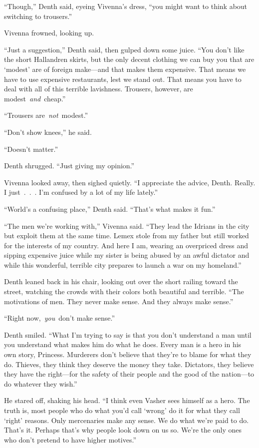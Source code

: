 “Though,” Denth said, eyeing Vivenna’s dress, “you might want to think about switching to trousers.”

Vivenna frowned, looking up.

“Just a suggestion,” Denth said, then gulped down some juice. “You don’t like the short Hallandren skirts, but the only decent clothing we can buy you that are ‘modest’ are of foreign make—and that makes them expensive. That means we have to use expensive restaurants, lest we stand out. That means you have to deal with all of this terrible lavishness. Trousers, however, are modest~\textit{and}~cheap.”

“Trousers are~\textit{not}~modest.”

“Don’t show knees,” he said.

“Doesn’t matter.”

Denth shrugged. “Just giving my opinion.”

Vivenna looked away, then sighed quietly. “I appreciate the advice, Denth. Really. I just~.~.~. I’m confused by a lot of my life lately.”

“World’s a confusing place,” Denth said. “That’s what makes it fun.”

“The men we’re working with,” Vivenna said. “They lead the Idrians in the city but exploit them at the same time. Lemex stole from my father but still worked for the interests of my country. And here I am, wearing an overpriced dress and sipping expensive juice while my sister is being abused by an awful dictator and while this wonderful, terrible city prepares to launch a war on my homeland.”

Denth leaned back in his chair, looking out over the short railing toward the street, watching the crowds with their colors both beautiful and terrible. “The motivations of men. They never make sense. And they always make sense.”

“Right now,~\textit{you}~don’t make sense.”

Denth smiled. “What I’m trying to say is that you don’t understand a man until you understand what makes him do what he does. Every man is a hero in his own story, Princess. Murderers don’t believe that they’re to blame for what they do. Thieves, they think they deserve the money they take. Dictators, they believe they have the right—for the safety of their people and the good of the nation—to do whatever they wish.”

He stared off, shaking his head. “I think even Vasher sees himself as a hero. The truth is, most people who do what you’d call ‘wrong’ do it for what they call ‘right’ reasons. Only mercenaries make any sense. We do what we’re paid to do. That’s it. Perhaps that’s why people look down on us so. We’re the only ones who don’t pretend to have higher motives.”


